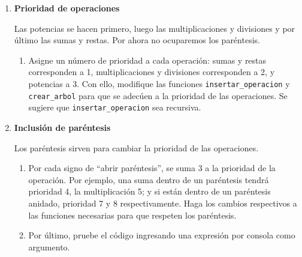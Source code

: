 \documentclass[a4paper,10pt]{article}
\begin{document}
\begin{enumerate}
  \item \textbf{Prioridad de operaciones}

  Las potencias se hacen primero, luego las multiplicaciones y divisiones y por último las sumas y restas. Por ahora no ocuparemos los paréntesis.
  
  \begin{enumerate}
    \item Asigne un número de prioridad a cada operación: sumas y restas corresponden a 1, multiplicaciones y divisiones corresponden a 2, y potencias a 3.
	  Con ello, modifique las funciones \texttt{insertar\_operacion} y \texttt{crear\_arbol} para que se adecúen a la prioridad de las operaciones.
	  Se sugiere que \texttt{insertar\_operacion} sea recursiva.
  \end{enumerate}
  
  \item \textbf{Inclusión de paréntesis}

  Los paréntesis sirven para cambiar la prioridad de las operaciones.

  \begin{enumerate}
    \item Por cada signo de ``abrir paréntesis'', se suma 3 a la prioridad de la operación. Por ejemplo, una suma dentro de un paréntesis tendrá prioridad 4,
	  la multiplicación 5; y si están dentro de un paréntesis anidado, prioridad 7 y 8 respectivamente. Haga los cambios respectivos a las funciones necesarias
	  para que respeten los paréntesis.
    \item Por último, pruebe el código ingresando una expresión por consola como argumento. 
  \end{enumerate}

\end{enumerate}
\end{document}

